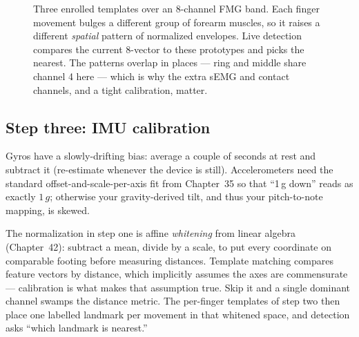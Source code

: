 \begin{figure}[H]
\centering
{}
\caption{Three enrolled templates over an 8-channel FMG band. Each finger
movement bulges a different group of forearm muscles, so it raises a different
\emph{spatial} pattern of normalized envelopes. Live detection compares the
current 8-vector to these prototypes and picks the nearest. The patterns overlap
in places --- ring and middle share channel 4 here --- which is why the extra
sEMG and contact channels, and a tight calibration, matter.}
\label{ch41:fig-templates}
\end{figure}

\subsection{Step three: IMU calibration}

Gyros have a slowly-drifting bias: average a couple of seconds at rest and
subtract it (re-estimate whenever the device is still). Accelerometers need the
standard offset-and-scale-per-axis fit from Chapter~35 so that ``1\,g down''
reads as exactly $1\,g$; otherwise your gravity-derived tilt, and thus your
pitch-to-note mapping, is skewed.

\begin{connectionbox}
The normalization in step one is affine \emph{whitening} from linear algebra (Chapter~42): subtract a mean, divide by a scale, to put every
coordinate on comparable footing before measuring distances. Template matching
compares feature vectors by distance, which implicitly assumes the axes are
commensurate --- calibration is what makes that assumption true. Skip it and a
single dominant channel swamps the distance metric. The per-finger templates of
step two then place one labelled landmark per movement in that whitened space,
and detection asks ``which landmark is nearest.''
\end{connectionbox}

